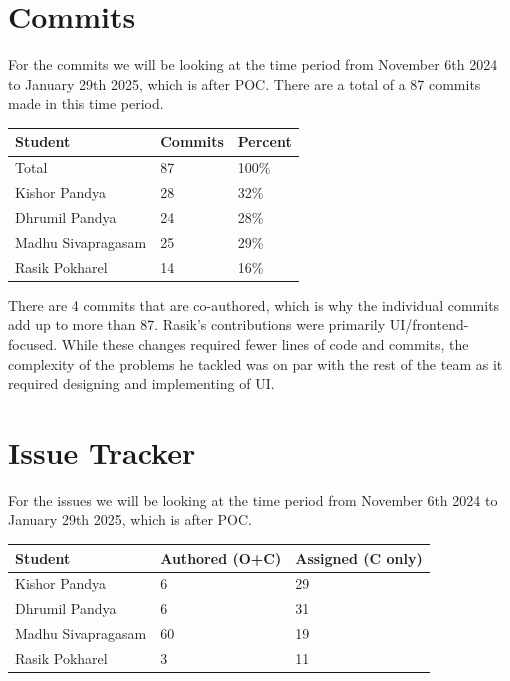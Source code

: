 \documentclass{article}
\begin{document}
\section{Commits}

For the commits we will be looking at the time period from November 6th 2024 to January 29th 2025, which is after POC. There are a total of a 87 commits made in this time period.\\

\begin{table}[H]
\centering
\begin{tabular}{lll}
\toprule
\textbf{Student} & \textbf{Commits} & \textbf{Percent}\\
\midrule
Total & 87 & 100\% \\
Kishor Pandya & 28 & 32\% \\
Dhrumil Pandya & 24 & 28\% \\
Madhu Sivapragasam & 25 & 29\% \\
Rasik Pokharel & 14 & 16\% \\
\bottomrule
\end{tabular}
\end{table}

There are 4 commits that are co-authored, which is why the individual commits add up to more than 87. Rasik's contributions were primarily UI/frontend-focused. While these changes required fewer lines of code and commits, the complexity of the problems he tackled was on par with the rest of the team as it required designing and implementing of UI.


\section{Issue Tracker}

For the issues we will be looking at the time period from November 6th 2024 to January 29th 2025, which is after POC.\\

\begin{table}[H]
\centering
\begin{tabular}{lll}
\toprule
\textbf{Student} & \textbf{Authored (O+C)} & \textbf{Assigned (C only)}\\
\midrule
Kishor Pandya & 6 & 29 \\
Dhrumil Pandya & 6 & 31 \\
Madhu Sivapragasam & 60 & 19 \\
Rasik Pokharel & 3 & 11 \\
\bottomrule
\end{tabular}
\end{table}
\end{document}
